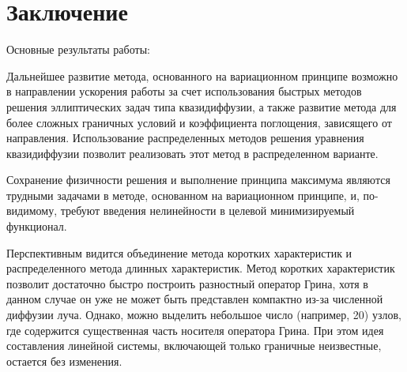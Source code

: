 \chapter*{Заключение}						%


Основные результаты работы:


Дальнейшее развитие метода, основанного на вариационном принципе возможно в направлении ускорения работы за счет использования быстрых методов решения эллиптических задач типа квазидиффузии, а также развитие метода для более сложных граничных условий и коэффициента поглощения, зависящего от направления. Использование распределенных методов решения уравнения квазидиффузии позволит реализовать этот метод в распределенном варианте.

Сохранение физичности решения и выполнение принципа максимума являются трудными задачами в методе, основанном на вариационном принципе, и, по-видимому, требуют введения нелинейности в целевой минимизируемый функционал.

Перспективным видится объединение метода коротких характеристик и распределенного метода длинных характеристик. Метод коротких характеристик позволит достаточно быстро построить разностный оператор Грина, хотя в данном случае он уже не может быть представлен компактно из-за численной диффузии луча. Однако, можно выделить небольшое число (например, 20) узлов, где содержится существенная часть носителя оператора Грина. При этом идея составления линейной системы, включающей только граничные неизвестные, остается без изменения.
